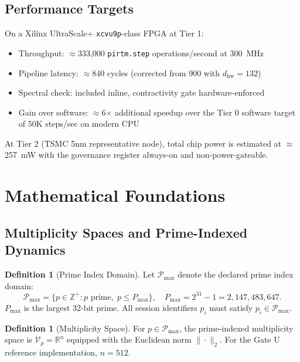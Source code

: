 \documentclass[12pt,letterpaper]{article}
\theoremstyle{plain}
\theoremstyle{definition}
\newtheorem{definition}[theorem]{Definition}
\theoremstyle{remark}
\begin{document}
\subsection{Performance Targets}

On a Xilinx UltraScale+ \texttt{xcvu9p}-class FPGA at Tier 1:
\begin{itemize}
  \item Throughput: $\approx$333,000 \texttt{pirtm.step} operations/second at 300~MHz
  \item Pipeline latency: $\approx$840 cycles (corrected from 900 with \(d_{\mathrm{hw}}=132\))
  \item Spectral check: included inline, contractivity gate hardware-enforced
  \item Gain over software: $\approx$6$\times$ additional speedup over the Tier 0
        software target of 50K steps/sec on modern CPU
\end{itemize}

At Tier 2 (TSMC 5nm representative node), total chip power is estimated at
$\approx$257~mW with the governance register always-on and
non-power-gateable.

\section{Mathematical Foundations}

\subsection{Multiplicity Spaces and Prime-Indexed Dynamics}

\begin{definition}[Prime Index Domain]
Let \(\mathcal{P}_{\max}\) denote the declared prime index domain:
\[
  \mathcal{P}_{\max} = \bigl\{ p \in \mathbb{Z}^+ : p \text{ prime},\; p \leq P_{\max} \bigr\},
  \quad P_{\max} = 2^{31} - 1 = 2{,}147{,}483{,}647.
\]
\(P_{\max}\) is the largest 32-bit prime. All session identifiers \(p_i\) must
satisfy \(p_i \in \mathcal{P}_{\max}\).
\end{definition}

\begin{definition}[Multiplicity Space]
For \(p \in \mathcal{P}_{\max}\), the prime-indexed multiplicity space is
\(\mathcal{V}_p = \mathbb{R}^n\) equipped with the Euclidean norm
\(\|\cdot\|_2\). For the Gate U reference implementation, \(n = 512\).
\end{definition}
\end{document}
